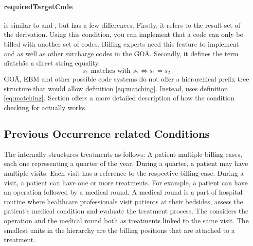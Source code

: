 \paragraph{requiredTargetCode}

 is similar to  and , but has a few differences.
Firstly, it refers to the result set of the derivation.
Using this condition, you can implement that a code can only be billed with another set of codes.
Billing experts need this feature to implement  and  as well as other surcharge codes in the GOÄ.
Secondly, it defines the term \"match\" as a direct string equality.
\begin{equation}\label{eq:matching-string-equals}
s_1 \text{ matches with } s_2 \iff s_1 = s_2
\end{equation}
GOÄ, EBM and other possible code systems do not offer a hierarchical prefix tree structure that would allow definition \ref{eq:matching}.
Instead,  uses definition \ref{eq:matching}.
Section \addref offers a more detailed description of how the condition checking for  actually works.

\subsection{Previous Occurrence related Conditions}\label{subsec:previous-occurrence-related}

The \AVS internally structures treatments as follows:
A patient multiple billing cases, each one representing a quarter of the year.
During a quarter, a patient may have multiple visits.
Each visit has a reference to the respective billing case.
During a visit, a patient can have one or more treatments.
For example, a patient can have an operation followed by a medical round.
A medical round is a part of hospital routine where healthcare professionals visit patients at their bedsides,
assess the patient's medical condition and evaluate the treatment process.
The \AVS considers the operation and the medical round both as treatments linked to the same visit.
The smallest units in the hierarchy are the billing positions that are attached to a treatment.

